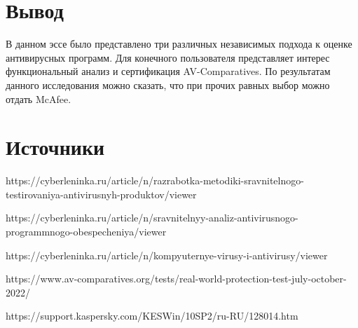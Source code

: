 \documentclass[%
preprint,
amsmath,amssymb,
aps,
]{revtex4-2}
\begin{document}
\section{Вывод}
В данном эссе было представлено три различных независимых подхода к оценке антивирусных программ. Для конечного пользователя представляет интерес функциональный анализ и сертификация AV-Comparatives. По результатам данного исследования можно сказать, что при прочих равных выбор можно отдать McAfee.

\section{Источники}
https://cyberleninka.ru/article/n/razrabotka-metodiki-sravnitelnogo-testirovaniya-antivirusnyh-produktov/viewer

https://cyberleninka.ru/article/n/sravnitelnyy-analiz-antivirusnogo-programmnogo-obespecheniya/viewer

https://cyberleninka.ru/article/n/kompyuternye-virusy-i-antivirusy/viewer

https://www.av-comparatives.org/tests/real-world-protection-test-july-october-2022/

https://support.kaspersky.com/KESWin/10SP2/ru-RU/128014.htm
\end{document}
